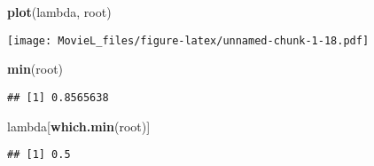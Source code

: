 \documentclass[
]{article}
\newenvironment{Shaded}{\begin{snugshade}}{\end{snugshade}}
\newcommand{\KeywordTok}[1]{\textcolor[rgb]{0.13,0.29,0.53}{\textbf{#1}}}
\newcommand{\NormalTok}[1]{#1}
\begin{document}
\begin{Shaded}
\begin{Highlighting}[]
\KeywordTok{plot}\NormalTok{(lambda, root)}
\end{Highlighting}
\end{Shaded}

\texttt{[image: MovieL\_files/figure-latex/unnamed-chunk-1-18.pdf]}

\begin{Shaded}
\begin{Highlighting}[]
\KeywordTok{min}\NormalTok{(root)}
\end{Highlighting}
\end{Shaded}

\begin{verbatim}
## [1] 0.8565638
\end{verbatim}

\begin{Shaded}
\begin{Highlighting}[]
\NormalTok{lambda[}\KeywordTok{which.min}\NormalTok{(root)]}
\end{Highlighting}
\end{Shaded}

\begin{verbatim}
## [1] 0.5
\end{verbatim}
\end{document}
